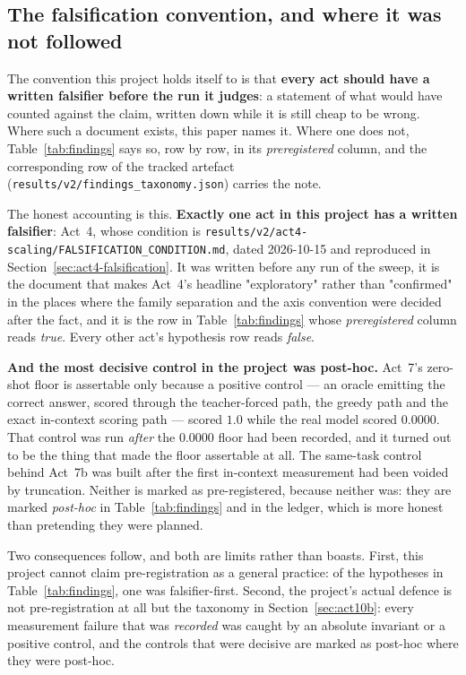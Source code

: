 \documentclass[11pt,a4paper]{article}
\begin{document}
\subsection{The falsification convention, and where it was not followed}
\label{sec:method-falsification}

The convention this project holds itself to is that \textbf{every act should
have a written falsifier before the run it judges}: a statement of what would
have counted against the claim, written down while it is still cheap to be
wrong. Where such a document exists, this paper names it. Where one does not,
Table~\ref{tab:findings} says so, row by row, in its \emph{preregistered}
column, and the corresponding row of the tracked artefact
(\texttt{results/v2/findings\_taxonomy.json}) carries the note.

The honest accounting is this. \textbf{Exactly one act in this project has a
written falsifier}: Act~4, whose condition is
\texttt{results/v2/act4-scaling/FALSIFICATION\_CONDITION.md}, dated 2026-10-15
and reproduced in Section~\ref{sec:act4-falsification}. It was written before
any run of the sweep, it is the document that makes Act~4's headline
"exploratory" rather than "confirmed" in the places where the family
separation and the axis convention were decided after the fact, and it is the
row in Table~\ref{tab:findings} whose \emph{preregistered} column reads
\emph{true}. Every other act's hypothesis row reads \emph{false}.

\textbf{And the most decisive control in the project was post-hoc.} Act~7's
zero-shot floor is assertable only because a positive control --- an oracle
emitting the correct answer, scored through the teacher-forced path, the
greedy path and the exact in-context scoring path --- scored $1.0$ while the
real model scored $0.0000$. That control was run \emph{after} the $0.0000$
floor had been recorded, and it turned out to be the thing that made the
floor assertable at all. The same-task control behind Act~7b was built after
the first in-context measurement had been voided by truncation. Neither is
marked as pre-registered, because neither was: they are marked
\emph{post-hoc} in Table~\ref{tab:findings} and in the ledger, which is more
honest than pretending they were planned.

Two consequences follow, and both are limits rather than boasts. First, this
project cannot claim pre-registration as a general practice: of the
hypotheses in Table~\ref{tab:findings}, one was falsifier-first. Second, the
project's actual defence is not pre-registration at all but the taxonomy in
Section~\ref{sec:act10b}: every measurement failure that was \emph{recorded}
was caught by an absolute invariant or a positive control, and the controls
that were decisive are marked as post-hoc where they were post-hoc.
\end{document}
